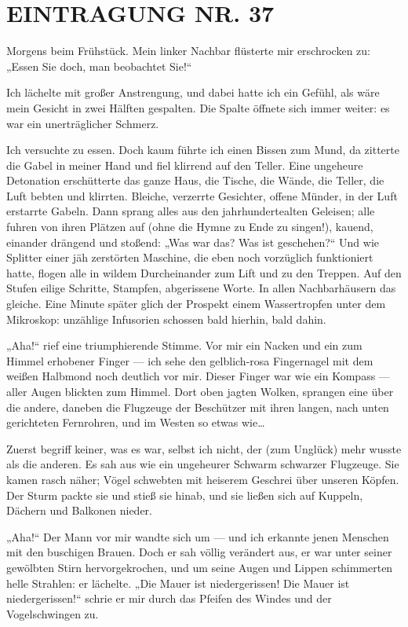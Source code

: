 \section{EINTRAGUNG NR. 37}

Morgens beim Frühstück. Mein linker Nachbar flüsterte mir
erschrocken zu: „Essen Sie doch, man beobachtet Sie!“

Ich lächelte mit großer Anstrengung, und dabei hatte ich ein
Gefühl, als wäre mein Gesicht in zwei Hälften gespalten. Die Spalte
öffnete sich immer weiter: es war ein unerträglicher Schmerz.

Ich versuchte zu essen. Doch kaum führte ich einen Bissen zum Mund,
da zitterte die Gabel in meiner Hand und fiel klirrend auf den
Teller. Eine ungeheure Detonation erschütterte das ganze Haus, die
Tische, die Wände, die Teller, die Luft bebten und klirrten.
Bleiche, verzerrte Gesichter, offene Münder, in der Luft erstarrte
Gabeln. Dann sprang alles aus den jahrhundertealten Geleisen; alle
fuhren von ihren Plätzen auf (ohne die Hymne zu Ende zu singen!),
kauend, einander drängend und stoßend: „Was war das? Was ist
geschehen?“ Und wie Splitter einer jäh zerstörten Maschine, die
eben noch vorzüglich funktioniert hatte, flogen alle in wildem
Durcheinander zum Lift und zu den Treppen. Auf den Stufen eilige
Schritte, Stampfen, abgerissene Worte. In allen Nachbarhäusern das
gleiche. Eine Minute später glich der Prospekt einem Wassertropfen
unter dem Mikroskop: unzählige Infusorien schossen bald hierhin,
bald dahin.

„Aha!“ rief eine triumphierende Stimme. Vor mir ein Nacken und ein
zum Himmel erhobener Finger — ich sehe den gelblich-rosa
Fingernagel mit dem weißen Halbmond noch deutlich vor mir. Dieser
Finger war wie ein
Kompass — aller Augen blickten zum Himmel. Dort oben jagten Wolken,
sprangen eine über die andere, daneben die Flugzeuge der Beschützer
mit ihren langen, nach unten gerichteten Fernrohren, und im Westen
so etwas wie\ldots{}

Zuerst begriff keiner, was es war, selbst ich nicht, der (zum
Unglück) mehr wusste als die anderen. Es sah aus wie ein ungeheurer
Schwarm schwarzer Flugzeuge. Sie kamen rasch näher; Vögel schwebten
mit heiserem Geschrei über unseren Köpfen. Der Sturm packte sie und
stieß sie hinab, und sie ließen sich auf Kuppeln, Dächern und
Balkonen nieder.

„Aha!“ Der Mann vor mir wandte sich um — und ich erkannte jenen
Menschen mit den buschigen Brauen. Doch er sah völlig verändert
aus, er war unter seiner gewölbten Stirn hervorgekrochen, und um
seine Augen und Lippen schimmerten helle Strahlen: er lächelte.
„Die Mauer ist niedergerissen! Die Mauer ist niedergerissen!“
schrie er mir durch das Pfeifen des Windes und der Vogelschwingen
zu.

